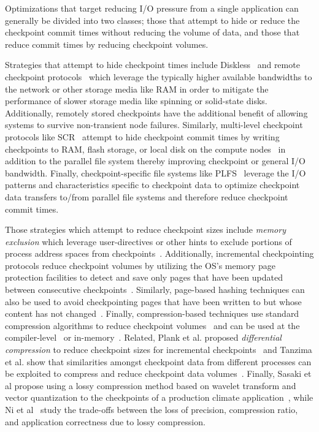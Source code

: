 Optimizations that target reducing I/O pressure from a single application can
generally be divided into two classes; those that attempt to hide or reduce the
checkpoint commit times without reducing the volume of data, and those that
reduce commit times by reducing checkpoint volumes.

Strategies that attempt to hide checkpoint times include
Diskless~\cite{Plank98Diskless} and remote checkpoint
protocols~\cite{Cornwell11RemoteBLCR}
which leverage the typically higher available bandwidths to the network or
other storage media like RAM in order to mitigate the performance of slower
storage media like spinning or solid-state disks. Additionally, remotely stored
checkpoints have the additional benefit of allowing systems to survive
non-transient node failures. Similarly, multi-level checkpoint protocols like
SCR~\cite{Moody10SCR,Vaidya95TwoLevel} attempt to hide checkpoint commit times
by writing checkpoints to RAM, flash storage, or local disk on the compute
nodes~\cite{Kougkas2017} in addition to the parallel file system thereby
improving checkpoint or general I/O bandwidth.  Finally, checkpoint-specific
file systems like PLFS~\cite{Bent09PLFS} leverage the I/O patterns and
characteristics specific to checkpoint data to optimize checkpoint data
transfers to/from parallel file systems and therefore reduce checkpoint commit
times.

Those strategies which attempt to reduce checkpoint sizes include \emph{memory
exclusion} which leverage user-directives or other hints to exclude portions of
process address spaces from checkpoints~\cite{Plank99MemoryExclusion}.
Additionally, incremental checkpointing protocols reduce checkpoint volumes by
utilizing the OS's memory page protection facilities to detect and save only
pages that have been updated between consecutive
checkpoints~\cite{Bronevetsky09Compiler,
Chen97CLIP,Elnozahy92ConsistentCheckpointing,Li94ConcurrentCheckpointing,
Plank94Libckpt,Paun10IncrementalWeibull,Kiswany08stdchk}.  Similarly,
page-based hashing techniques can also be used to avoid checkpointing pages
that have been written to but whose content has not
changed~\cite{Ferreira11Libhashckpt}.  Finally, compression-based techniques
use standard compression algorithms to reduce checkpoint
volumes~\cite{Ibtesham12Compression} and can be used at the
compiler-level~\cite{Li90CATCH} or in-memory~\cite{Plank94ICKP}.  Related,
Plank et al. proposed \textit{differential compression} to reduce checkpoint
sizes for incremental checkpoints~\cite{Plank95CompressedDiff} and Tanzima et
al.  show that similarities amongst checkpoint data from different processes
can be exploited to compress and reduce checkpoint data
volumes~\cite{tanzima12mcrengine}.  Finally, Sasaki et al propose using a lossy
compression method based on wavelet transform and vector quantization to the
checkpoints of a production climate application~\cite{sasaki2015}, while Ni et
al~\cite{Ni2014} study the trade-offs between the loss of precision, compression
ratio, and application correctness due to lossy compression.

